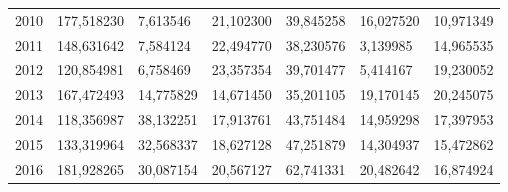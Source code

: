 \begin{table}
\begin{tabular}{p{1cm}p{2cm}p{2cm}p{2cm}p{2cm}p{2cm}p{2cm}}
 2010 &      177,518230 &         7,613546 &         21,102300 &                         39,845258 &                             16,027520 &                        10,971349 \\
 2011 &      148,631642 &         7,584124 &         22,494770 &                         38,230576 &                              3,139985 &                        14,965535 \\
 2012 &      120,854981 &         6,758469 &         23,357354 &                         39,701477 &                              5,414167 &                        19,230052 \\
 2013 &      167,472493 &        14,775829 &         14,671450 &                         35,201105 &                             19,170145 &                        20,245075 \\
 2014 &      118,356987 &        38,132251 &         17,913761 &                         43,751484 &                             14,959298 &                        17,397953 \\
 2015 &      133,319964 &        32,568337 &         18,627128 &                         47,251879 &                             14,304937 &                        15,472862 \\
 2016 &      181,928265 &        30,087154 &         20,567127 &                         62,741331 &                             20,482642 &                        16,874924 \\
\bottomrule
\end{tabular}
\end{table}
